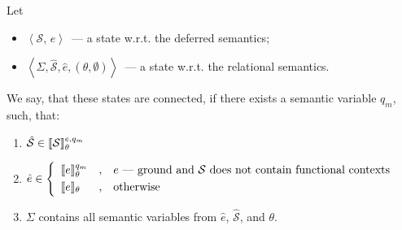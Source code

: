 \begin{definition}
\normalfont Let 
\begin{itemize}
\item \mbox{$\left<\mathcal S,\,e\right>$}~--- a state w.r.t. the deferred semantics;
\item \mbox{$\left<\Sigma, \hat{\mathcal S}, \hat{e}, (\theta, \emptyset)\right>$}~--- a state w.r.t. the
relational semantics.
\end{itemize} 

We say, that these states are connected, if there exists a semantic variable $q_m$, such, that:\vspace{1mm}

\begin{enumerate}
\item \mbox{$\hat{\mathcal S}\in\llbracket{\mathcal S}\rrbracket^{e,q_m}_\theta$}\vspace{1mm}
\item \mbox{$\hat{e}\in\left\{
                          \begin{array}{lcl}
                            \llbracket{e}\rrbracket^{q_m}_\theta&,&e\mbox{~--- ground and }\mathcal S\mbox{ does not contain functional contexts}\\[1mm]
                            \llbracket{e}\rrbracket_\theta&,&\mbox{otherwise}
                          \end{array}
                       \right.
            $} 
\item $\Sigma$ contains all semantic variables from $\hat{e}$, $\hat{\mathcal S}$, and $\theta$.
\end{enumerate}

\end{definition}


